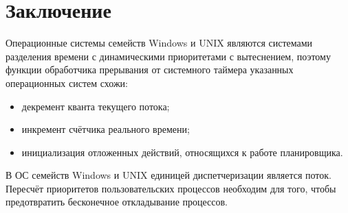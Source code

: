 \chapter*{Заключение}

Операционные системы семейств Windows и UNIX являются системами разделения времени с динамическими приоритетами с вытеснением, поэтому функции обработчика прерывания от системного таймера указанных операционных систем схожи:
\begin{itemize}
	\item декремент кванта текущего потока;
	\item инкремент счётчика реального времени;
	\item инициализация отложенных действий, относящихся к работе планировщика.
\end{itemize}

В ОС семейств Windows и UNIX единицей диспетчеризации является поток.
Пересчёт приоритетов пользовательских процессов необходим для того, чтобы предотвратить бесконечное откладывание процессов.
